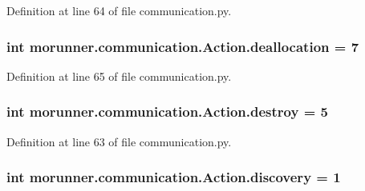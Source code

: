 Definition at line 64 of file communication.\+py.

\hypertarget{classmorunner_1_1communication_1_1Action_ad318c65952cf6ea310ffe8a755ae822c}{}
\subsubsection[{deallocation}]{\setlength{\rightskip}{0pt plus 5cm}int morunner.\+communication.\+Action.\+deallocation = 7\hspace{0.3cm}{\ttfamily [static]}}\label{classmorunner_1_1communication_1_1Action_ad318c65952cf6ea310ffe8a755ae822c}


Definition at line 65 of file communication.\+py.

\hypertarget{classmorunner_1_1communication_1_1Action_aa749211a8116f9320662c45442f2b09f}{}
\subsubsection[{destroy}]{\setlength{\rightskip}{0pt plus 5cm}int morunner.\+communication.\+Action.\+destroy = 5\hspace{0.3cm}{\ttfamily [static]}}\label{classmorunner_1_1communication_1_1Action_aa749211a8116f9320662c45442f2b09f}


Definition at line 63 of file communication.\+py.

\hypertarget{classmorunner_1_1communication_1_1Action_a367a02befe76df874fe36b7342873f88}{}
\subsubsection[{discovery}]{\setlength{\rightskip}{0pt plus 5cm}int morunner.\+communication.\+Action.\+discovery = 1\hspace{0.3cm}{\ttfamily [static]}}\label{classmorunner_1_1communication_1_1Action_a367a02befe76df874fe36b7342873f88}


